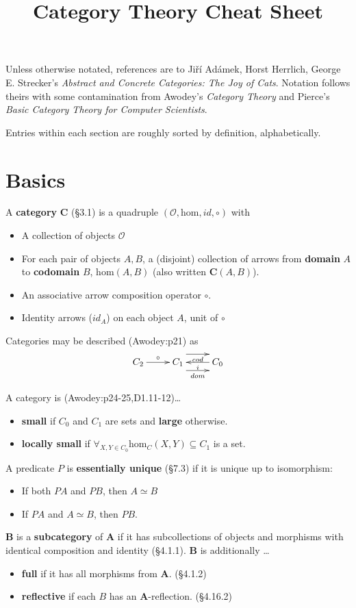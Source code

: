 \documentclass[10pt,twocolumn,letterpaper]{article}
\title{Category Theory Cheat Sheet}
\newcommand{\defn}[1]{{\bf #1}}
\begin{document}
Unless otherwise notated, references are to Ji\v{r}\'i Ad\'amek, Horst
Herrlich, George E. Strecker's \textit{Abstract and Concrete Categories: The
Joy of Cats}.  Notation follows theirs with some contamination from Awodey's
\textit{Category Theory} and Pierce's \textit{Basic Category Theory for
Computer Scientists}.

Entries within each section are roughly sorted by definition, alphabetically.

\section{Basics}

  A \defn{category} $\mathbf{C}$ (\S3.1) is a quadruple
  $(\mathcal{O},\mbox{hom},id,\circ)$ with
  \begin{itemize}
    \item A collection of objects $\mathcal{O}$
  \item For each pair of objects $A,B$, a (disjoint) collection of arrows
    from \defn{domain} $A$ to \defn{codomain} $B$,
    $\mbox{hom}(A,B)$ (also written $\mathbf{C}(A,B)$).
    \item An associative arrow composition operator $\circ$.
    \item Identity arrows ($id_A$) on each object $A$, unit of $\circ$
  \end{itemize}

  Categories may be described (Awodey:p21) as
     \[\xymatrix{ C_2 \ar[r]^\circ & C_1 \ar@<2ex>[r]_{cod} \ar@<-2ex>[r]_{dom} & C_0 \ar[l]^i }\]

  A category is (Awodey:p24-25,D1.11-12)\dots
    \begin{itemize}
      \item \defn{small} if $C_0$ and $C_1$ are sets and \defn{large} otherwise.
      \item \defn{locally small} if $\forall_{X,Y \in C_0} \mbox{hom}_C(X,Y) \subseteq C_1$ is a set.
    \end{itemize}

  A predicate $P$ is \defn{essentially unique} (\S7.3) if it is unique up to
  isomorphism:
  \begin{itemize}
    \item If both $PA$ and $PB$, then $A \simeq B$
    \item If $PA$ and $A \simeq B$, then $PB$.
  \end{itemize}

  $\mathbf{B}$ is a \defn{subcategory} of $\mathbf{A}$ if it has
  subcollections of objects and morphisms with identical composition and
  identity (\S4.1.1).  $\mathbf{B}$ is additionally \dots
  \begin{itemize}
	\item \defn{full} if it has all morphisms from $\mathbf{A}$. (\S4.1.2) 
	\item \defn{reflective} if each $B$ has an $\mathbf{A}$-reflection. (\S4.16.2)
  \end{itemize}
\end{document}
